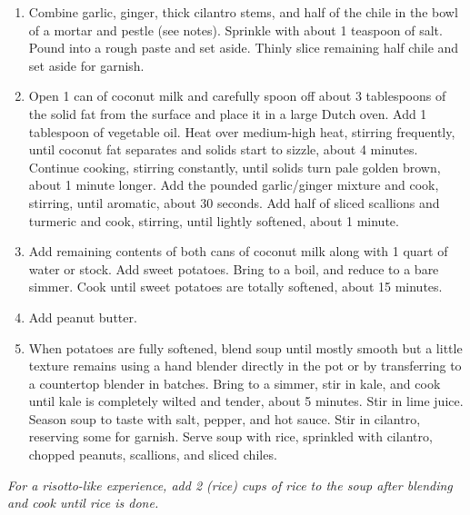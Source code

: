 \begin{enumerate}
    \item Combine garlic, ginger, thick cilantro stems, and half of the chile in the bowl of a mortar and pestle (see notes). Sprinkle with about 1 teaspoon of salt. Pound into a rough paste and set aside. Thinly slice remaining half chile and set aside for garnish.
    \item Open 1 can of coconut milk and carefully spoon off about 3 tablespoons of the solid fat from the surface and place it in a large Dutch oven. Add 1 tablespoon of vegetable oil. Heat over medium-high heat, stirring frequently, until coconut fat separates and solids start to sizzle, about 4 minutes. Continue cooking, stirring constantly, until solids turn pale golden brown, about 1 minute longer. Add the pounded garlic/ginger mixture and cook, stirring, until aromatic, about 30 seconds. Add half of sliced scallions and turmeric and cook, stirring, until lightly softened, about 1 minute.
    \item Add remaining contents of both cans of coconut milk along with 1 quart of water or stock. Add sweet potatoes. Bring to a boil, and reduce to a bare simmer. Cook until sweet potatoes are totally softened, about 15 minutes.
    \item Add peanut butter.
    \item When potatoes are fully softened, blend soup until mostly smooth but a little texture remains using a hand blender directly in the pot or by transferring to a countertop blender in batches. Bring to a simmer, stir in kale, and cook until kale is completely wilted and tender, about 5 minutes. Stir in lime juice. Season soup to taste with salt, pepper, and hot sauce. Stir in cilantro, reserving some for garnish. Serve soup with rice, sprinkled with cilantro, chopped peanuts, scallions, and sliced chiles.
\end{enumerate}

\emph{For a risotto-like experience, add 2 (rice) cups of rice to the soup after blending and cook until rice is done.}
